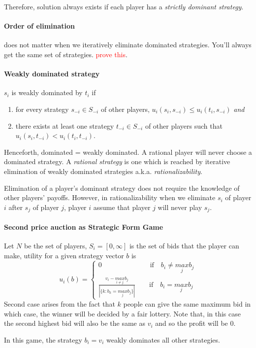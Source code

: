 Therefore, solution always exists if each player has a \textit{strictly dominant strategy}.

\paragraph{Order of elimination} does not matter when we iteratively eliminate dominated strategies. You'll always get the same set of strategies. \textcolor{red}{prove this}.

\paragraph{Weakly dominated strategy} $s_i$ is weakly dominated by $t_i$ if 
\begin{enumerate}
	\item for every strategy $s_{-i} \in S_{-i}$ of other players, $u_i(s_i, s_{-i}) \leq u_i(t_i, s_{-i})$ \textit{and}
	\item there exists at least one strategy $t_{-i} \in S_{-i}$ of other players such that $u_i(s_i, t_{-i}) < u_i(t_i, t_{-i})$.
\end{enumerate}

Henceforth, dominated = weakly dominated. A rational player will never choose a dominated strategy. A \textit{rational strategy} is one which is reached by iterative elimination of weakly dominated strategies a.k.a. \textit{rationalizability}. 

Elimination of a player's dominant strategy does not require the knowledge of other players' payoffs. However, in rationalizability when we eliminate $s_i$ of player $i$ after $s_j$ of player $j$, player $i$ assume that player $j$ will never play $s_j$.

\paragraph{Second price auction as Strategic Form Game} Let $N$ be the set of players, $S_i = [0, \infty]$ is the set of bids that the player can make, utility for a given strategy vector $b$ is 
\[
u_i(b) = 
\begin{cases}
0 \quad \quad \quad \quad \quad \quad \quad \text{if} \quad b_i \neq \underset{j}{max}b_j\\
\frac{v_i - \underset{i \neq j}{max}b_j}{|\{k: b_k = \underset{j}{max}b_j\}|} \quad \quad \text{if} \quad b_i = \underset{j}{max}b_j
\end{cases}
\]
Second case arises from the fact that $k$ people can give the same maximum bid in which case, the winner will be decided by a fair lottery. Note that, in this case the second highest bid will also be the same as $v_i$ and so the profit will be 0.

In this game, the strategy $b_i = v_i$ weakly dominates all other strategies.